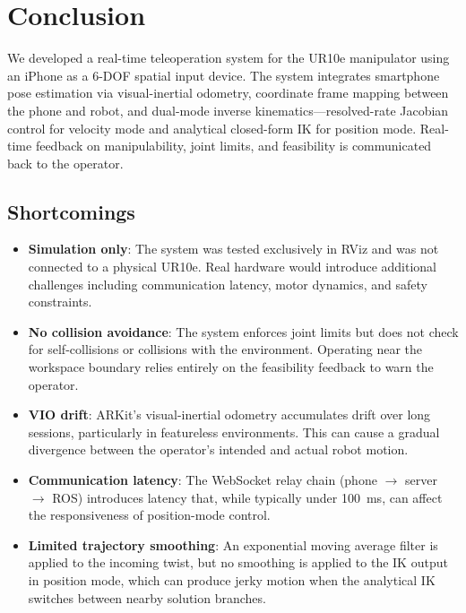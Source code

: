 \section{Conclusion}

We developed a real-time teleoperation system for the UR10e manipulator using an iPhone as a 6-DOF spatial input device. The system integrates smartphone pose estimation via visual-inertial odometry, coordinate frame mapping between the phone and robot, and dual-mode inverse kinematics---resolved-rate Jacobian control for velocity mode and analytical closed-form IK for position mode. Real-time feedback on manipulability, joint limits, and feasibility is communicated back to the operator.

\subsection{Shortcomings}

\begin{itemize}
    \item \textbf{Simulation only}: The system was tested exclusively in RViz and was not connected to a physical UR10e. Real hardware would introduce additional challenges including communication latency, motor dynamics, and safety constraints.

    \item \textbf{No collision avoidance}: The system enforces joint limits but does not check for self-collisions or collisions with the environment. Operating near the workspace boundary relies entirely on the feasibility feedback to warn the operator.

    \item \textbf{VIO drift}: ARKit's visual-inertial odometry accumulates drift over long sessions, particularly in featureless environments. This can cause a gradual divergence between the operator's intended and actual robot motion.

    \item \textbf{Communication latency}: The WebSocket relay chain (phone $\to$ server $\to$ ROS) introduces latency that, while typically under 100~ms, can affect the responsiveness of position-mode control.

    \item \textbf{Limited trajectory smoothing}: An exponential moving average filter is applied to the incoming twist, but no smoothing is applied to the IK output in position mode, which can produce jerky motion when the analytical IK switches between nearby solution branches.

\end{itemize}

